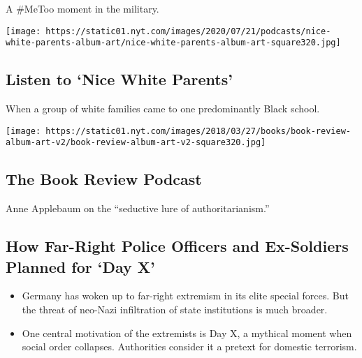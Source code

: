 A \#MeToo moment in the military.

\href{/2020/07/30/podcasts/nice-white-parents-serial.html}{}

\texttt{[image: https://static01.nyt.com/images/2020/07/21/podcasts/nice-white-parents-album-art/nice-white-parents-album-art-square320.jpg]}

\href{/2020/07/30/podcasts/nice-white-parents-serial.html}{}

\hypertarget{listen-to-nice-white-parents}{%
\subsection{Listen to `Nice White
Parents'}\label{listen-to-nice-white-parents}}

When a group of white families came to one predominantly Black school.

\href{/2020/07/31/books/review/podcast-twilight-democracy-anne-applebaum-eat-buddha-barbara-demick.html}{}

\texttt{[image: https://static01.nyt.com/images/2018/03/27/books/book-review-album-art-v2/book-review-album-art-v2-square320.jpg]}

\href{/2020/07/31/books/review/podcast-twilight-democracy-anne-applebaum-eat-buddha-barbara-demick.html}{}

\hypertarget{the-book-review-podcast}{%
\subsection{The Book Review Podcast}\label{the-book-review-podcast}}

Anne Applebaum on the ``seductive lure of authoritarianism.''

\href{/2020/08/01/world/europe/germany-nazi-infiltration.html}{}

\hypertarget{how-far-right-police-officers-and-ex-soldiers-planned-for-day-x}{%
\subsection{How Far-Right Police Officers and Ex-Soldiers Planned for
`Day
X'}\label{how-far-right-police-officers-and-ex-soldiers-planned-for-day-x}}

\begin{itemize}
\tightlist
\item
  Germany has woken up to far-right extremism in its elite special
  forces. But the threat of neo-Nazi infiltration of state institutions
  is much broader.
\item
  One central motivation of the extremists is Day X, a mythical moment
  when social order collapses. Authorities consider it a pretext for
  domestic terrorism.
\end{itemize}

